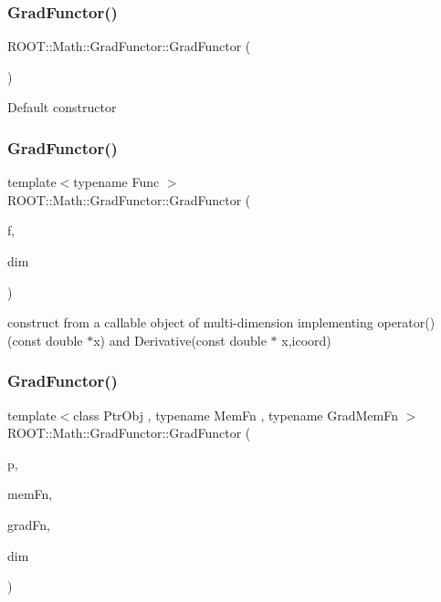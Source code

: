 \subsubsection{\texorpdfstring{GradFunctor()}{GradFunctor()}\hspace{0.1cm}{\footnotesize\ttfamily [6/10]}}
{\footnotesize\ttfamily R\+O\+O\+T\+::\+Math\+::\+Grad\+Functor\+::\+Grad\+Functor (\begin{DoxyParamCaption}{ }\end{DoxyParamCaption})\hspace{0.3cm}{\ttfamily [inline]}}

Default constructor \mbox{\label{classROOT_1_1Math_1_1GradFunctor_a9cdbcd3d49494b4209524b3c5b3172d2}} 
\subsubsection{\texorpdfstring{GradFunctor()}{GradFunctor()}\hspace{0.1cm}{\footnotesize\ttfamily [7/10]}}
{\footnotesize\ttfamily template$<$typename Func $>$ \\
R\+O\+O\+T\+::\+Math\+::\+Grad\+Functor\+::\+Grad\+Functor (\begin{DoxyParamCaption}\item[{const Func \&}]{f,  }\item[{unsigned int}]{dim }\end{DoxyParamCaption})\hspace{0.3cm}{\ttfamily [inline]}}

construct from a callable object of multi-\/dimension implementing operator()(const double $\ast$x) and Derivative(const double $\ast$ x,icoord) \mbox{\label{classROOT_1_1Math_1_1GradFunctor_af7c06950b37bea8844b81f53b0bf41df}} 
\subsubsection{\texorpdfstring{GradFunctor()}{GradFunctor()}\hspace{0.1cm}{\footnotesize\ttfamily [8/10]}}
{\footnotesize\ttfamily template$<$class Ptr\+Obj , typename Mem\+Fn , typename Grad\+Mem\+Fn $>$ \\
R\+O\+O\+T\+::\+Math\+::\+Grad\+Functor\+::\+Grad\+Functor (\begin{DoxyParamCaption}\item[{const Ptr\+Obj \&}]{p,  }\item[{Mem\+Fn}]{mem\+Fn,  }\item[{Grad\+Mem\+Fn}]{grad\+Fn,  }\item[{unsigned int}]{dim }\end{DoxyParamCaption})\hspace{0.3cm}{\ttfamily [inline]}}

